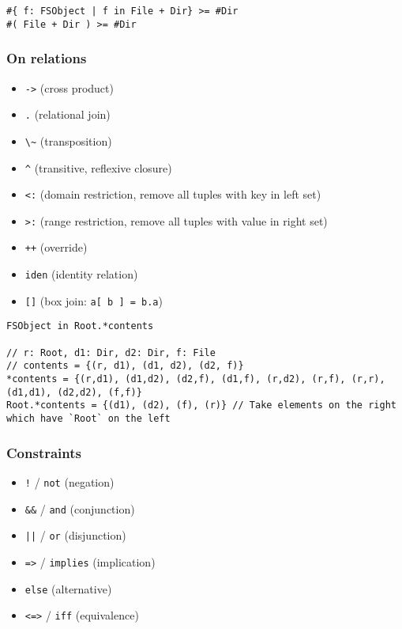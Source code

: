 \documentclass[11pt]{article}
\begin{document}
\begin{verbatim}
#{ f: FSObject | f in File + Dir} >= #Dir
#( File + Dir ) >= #Dir
\end{verbatim}

\subsubsection{On relations}
\label{sec:orge76f433}

\begin{itemize}
\item \texttt{->} (cross product)
\item \texttt{.} (relational join)
\item \texttt{\textbackslash{}\textasciitilde{}} (transposition)
\item \texttt{\textasciicircum{}} (transitive, reflexive closure)
\item \texttt{<:} (domain restriction, remove all tuples with key in left set)
\item \texttt{>:} (range restriction, remove all tuples with value in right set)
\item \texttt{++} (override)
\item \texttt{iden} (identity relation)
\item \texttt{[]} (box join: \texttt{a[ b ] = b.a})
\end{itemize}

\begin{verbatim}
FSObject in Root.*contents

// r: Root, d1: Dir, d2: Dir, f: File
// contents = {(r, d1), (d1, d2), (d2, f)}
*contents = {(r,d1), (d1,d2), (d2,f), (d1,f), (r,d2), (r,f), (r,r), (d1,d1), (d2,d2), (f,f)}
Root.*contents = {(d1), (d2), (f), (r)} // Take elements on the right which have `Root` on the left
\end{verbatim}

\subsubsection{Constraints}
\label{sec:org4d404b9}

\begin{itemize}
\item \texttt{!} / \texttt{not} (negation)
\item \texttt{\&\&} / \texttt{and} (conjunction)
\item \texttt{||} / \texttt{or} (disjunction)
\item \texttt{=>} / \texttt{implies} (implication)
\item \texttt{else} (alternative)
\item \texttt{<=>} / \texttt{iff} (equivalence)
\end{itemize}
\end{document}
